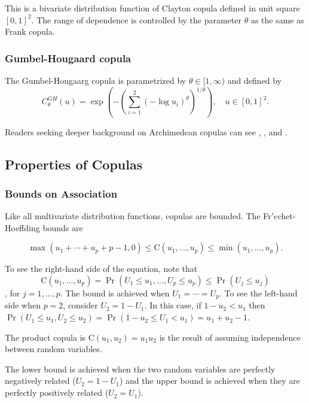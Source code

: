 \documentclass[]{book}
\theoremstyle{definition}
\theoremstyle{definition}
\theoremstyle{definition}
\theoremstyle{remark}
\begin{document}
This is a bivariate distribution function of Clayton copula defined in
unit square \([0,1]^2.\) The range of dependence is controlled by the
parameter \(\theta\) as the same as Frank copula.

\subsubsection{Gumbel-Hougaard copula}\label{gumbel-hougaard-copula}

The Gumbel-Hougaarg copula is parametrized by \(\theta \in [1,\infty)\)
and defined by
\[C_{\theta}^{GH}(u)=\exp\left(-\left(\sum_{i=1}^2 (-\log u_i)^{\theta}\right)^{1/\theta}\right), \quad u\in[0,1]^2.\]

Readers seeking deeper background on Archimedean copulas can see
\citet{joe2014dependence}, \citet{frees1998understanding}, and
\citet{genest1986bivariate}.

\subsection{Properties of Copulas}\label{properties-of-copulas}

\subsubsection{Bounds on Association}\label{bounds-on-association}

Like all multivariate distribution functions, copulas are bounded. The
Fr\('{e}\)chet-Hoeffding bounds are

\[\max( u_1 +\cdots+ u_p + p -1, 0) \leq  \mathrm{C}(u_1,  \ldots, u_p) \leq \min (u_1,  \ldots,u_p).\]

To see the right-hand side of the equation, note that
\[\mathrm{C}(u_1,\ldots, u_p) = \Pr(U_1 \leq u_1, \ldots, U_p \leq u_p) \leq  \Pr(U_j \leq u_j)\],
for \(j=1,\ldots,p\). The bound is achieved when \(U_1 = \cdots = U_p\).
To see the left-hand side when \(p=2\), consider \(U_2=1-U_1\). In this
case, if \(1-u_2 < u_1\) then
\(\Pr(U_1 \leq u_1, U_2 \leq u_2) = \Pr ( 1-u_2 \leq U_1 < u_1) =u_1+u_2-1.\)
\citep{nelsen1997introduction}

The product copula is \(\mathrm{C}(u_1,u_2)=u_1u_2\) is the result of
assuming independence between random variables.

The lower bound is achieved when the two random variables are perfectly
negatively related (\(U_2=1-U_1\)) and the upper bound is achieved when
they are perfectly positively related (\(U_2=U_1\)).
\end{document}
